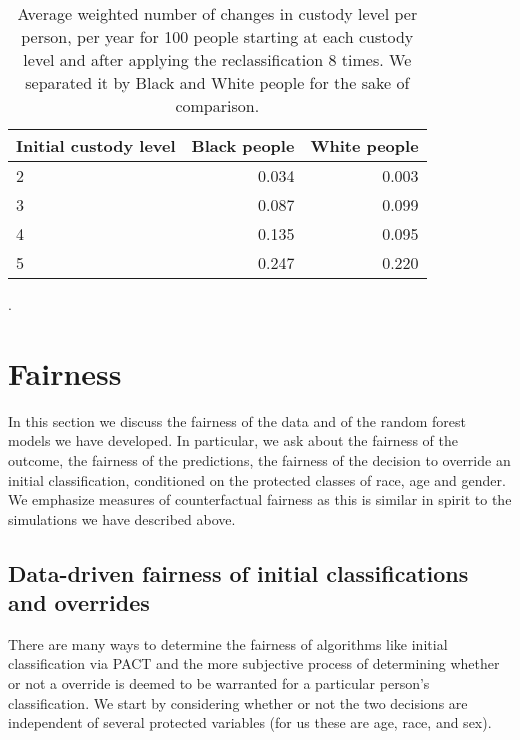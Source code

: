\documentclass{amsproc}
\numberwithin{equation}{section}
\theoremstyle{plain}
\theoremstyle{remark}
\begin{document}
\begin{table}
\begin{tabular}{|l||r|r|}\hline
Initial custody level & Black people & White people\\\hline
2 & 0.034 & 0.003 \\\hline
3 & 0.087 & 0.099 \\\hline
4 & 0.135 & 0.095 \\\hline
5 & 0.247 & 0.220 \\\hline
\end{tabular}
\caption{Average weighted number of changes in custody level per person, per year for 100 people starting at each custody level and after applying the reclassification 8 times.  We separated it by Black and White people for the sake of comparison.}\label{tbl:repeated-B-vs-W}.
\end{table}

\section{Fairness}\label{sec:cf}

In this section we discuss the fairness of the data and of the random forest models we have developed.  In particular, we ask about the fairness of the outcome,  the fairness of the predictions, the fairness of the decision to override an initial classification, conditioned on the protected classes of race, age and gender.  We emphasize measures of counterfactual fairness as this is similar in spirit to the simulations we have described above.


\subsection{Data-driven fairness of initial classifications and overrides}

There are many ways to determine the fairness of algorithms like initial classification via PACT and the more subjective process of determining whether or not a override is deemed to be warranted for a particular person's classification.  We start by considering whether or not the two decisions are independent of several protected variables (for us these are age, race, and sex).
\end{document}
